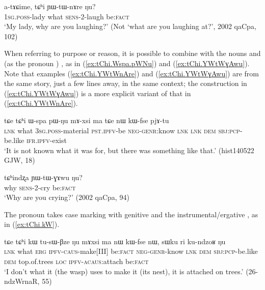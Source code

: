 \begin{exe}
\ex \label{ex:tChi.YWtWnAre}
\gll  a-tɤɕime, tɕʰi ɲɯ-tɯ-nɤre ŋu? \\
 \textsc{1sg}.\textsc{poss}-lady what \textsc{sens}-2-laugh be:\textsc{fact} \\
 \glt `My lady, why are you laughing?'  (Not `what are you laughing at?', 2002 qaCpa, 102)
\end{exe}  

When referring to purpose or reason, it is possible to combine   with the nouns  and  (as the pronoun ) , as in (\ref{ex:tChi.Wspa.pWNu}) and (\ref{ex:tChi.YWtWɣAwu}). Note that examples (\ref{ex:tChi.YWtWnAre}) and (\ref{ex:tChi.YWtWɣAwu}) are from the same story, just a few lines away, in the same context; the construction in (\ref{ex:tChi.YWtWɣAwu}) is a more explicit variant of that in (\ref{ex:tChi.YWtWnAre}).

\begin{exe}
\ex \label{ex:tChi.Wspa.pWNu}
\gll tɕe tɕʰi ɯ-spa pɯ-ŋu mɤ-xsi ma tɕe nɯ kɯ-fse pjɤ-tu  \\
\textsc{lnk} what \textsc{3sg}.\textsc{poss}-material \textsc{pst}.\textsc{ipfv}-be \textsc{neg}-\textsc{genr}:know \textsc{lnk} \textsc{lnk} \textsc{dem} \textsc{sbj}:\textsc{pcp}-be.like \textsc{ifr}.\textsc{ipfv}-exist \\
\glt `It is not known what it was for, but there was something like that.' (hist140522 GJW, 18)
\end{exe}  

\begin{exe}
\ex \label{ex:tChi.YWtWɣAwu}
\gll tɕʰindʐa ɲɯ-tɯ-ɣɤwu ŋu? \\
why \textsc{sens}-2-cry be:\textsc{fact} \\
\glt `Why are you crying?' (2002 qaCpa, 94)
\end{exe} 

The pronoun  takes case marking with genitive  and the instrumental/ergative , as in (\ref{ex:tChi.kW}).

\begin{exe}
\ex \label{ex:tChi.kW}
\gll tɕe tɕʰi kɯ tu-sɯ-βze ŋu mɤxsi ma nɯ kɯ-fse nɯ, sɯku ri ku-ndzoʁ ŋu \\
\textsc{lnk} what \textsc{erg} \textsc{ipfv}-\textsc{caus}-make[III] be:\textsc{fact} \textsc{neg}-\textsc{genr}-know \textsc{lnk} \textsc{dem} \textsc{sbj}:\textsc{pcp}-be.like \textsc{dem} top.of.trees \textsc{loc} \textsc{ipfv}-\textsc{acaus}:attach be:\textsc{fact} \\
\glt `I don't what it (the wasp) uses to make it (its nest), it is attached on trees.' (26-ndzWrnaR, 55)
\end{exe} 

